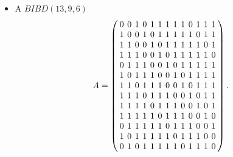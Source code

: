\documentclass{beamer}
\begin{document}
\begin{frame}

  \begin{itemize}
  \item A $BIBD(13,9,6)$
    \[
      A=
      \arraycolsep=2.0pt\def\arraystretch{1.0}
      \left(
      \begin{array}{ccccccccccccc}
        0&0&1&0&1&1&1&1&1&0&1&1&1\\
        1&0&0&1&0&1&1&1&1&1&0&1&1\\
        1&1&0&0&1&0&1&1&1&1&1&0&1\\
        1&1&1&0&0&1&0&1&1&1&1&1&0\\
        0&1&1&1&0&0&1&0&1&1&1&1&1\\
        1&0&1&1&1&0&0&1&0&1&1&1&1\\
        1&1&0&1&1&1&0&0&1&0&1&1&1\\
        1&1&1&0&1&1&1&0&0&1&0&1&1\\
        1&1&1&1&0&1&1&1&0&0&1&0&1\\
        1&1&1&1&1&0&1&1&1&0&0&1&0\\
        0&1&1&1&1&1&0&1&1&1&0&0&1\\
        1&0&1&1&1&1&1&0&1&1&1&0&0\\
        0&1&0&1&1&1&1&1&0&1&1&1&0\\
      \end{array}
      \right).
    \]
  \end{itemize}
  
\end{frame}

\end{document}
